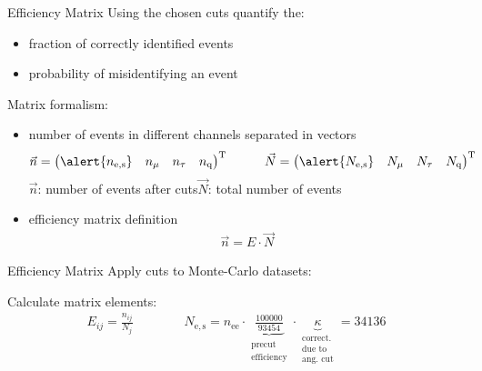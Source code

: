 \documentclass[11pt,xcolor=dvipsnames,professionalfonts]{beamer}
\begin{document}
\begin{frame}{Efficiency Matrix}
	Using the chosen cuts quantify the:
	\begin{itemize}
		\setlength\itemsep{1.em}
		\item fraction of correctly identified events
		\item probability of misidentifying an event
	\end{itemize}
	\vspace{0.7cm}
	\pause
	Matrix formalism:
	\begin{itemize}
		\setlength\itemsep{1.em}
		\item number of events in different channels separated in vectors
		\begin{align*}
			&\vec{n} = \begin{pmatrix}
			\alert{n_\mathrm{e,s}} & n_\mathrm{\mu} & n_\mathrm{\tau} & n_\mathrm{q}
			\end{pmatrix}^\mathrm{T}
			\qquad
			&\vec{N} = \begin{pmatrix}
			\alert{N_\mathrm{e,s}} & N_\mathrm{\mu} & N_\mathrm{\tau} & N_\mathrm{q}
			\end{pmatrix}^\mathrm{T}
		\end{align*}
		$\vec{n}$: number of events after cuts\qquad $\vec{N}$: total number of events 
		
		\item efficiency matrix definition
		\begin{align*}
			\vec{n} = E \cdot \vec{N}
		\end{align*}
		
		
	\end{itemize}
\end{frame}


\begin{frame}{Efficiency Matrix}
	Apply cuts to Monte-Carlo datasets:
	\begin{center}
		
	\end{center}
	\vspace{0.4cm}
	\pause
	Calculate matrix elements:
	\begin{align*}
		E_{ij} = \frac{n_{ij}}{N_j} \qquad\qquad N_\mathrm{e,s} = n_\mathrm{ee} \cdot \underbrace{\frac{100000}{93454}}_{\substack{\text{precut}\\\text{efficiency}}} \cdot \underbrace{\kappa}_{\substack{\text{correct.} \\ \text{due to} \\ \text{ang.\ cut}}} = 34136
	\end{align*}
\end{frame}
\end{document}

